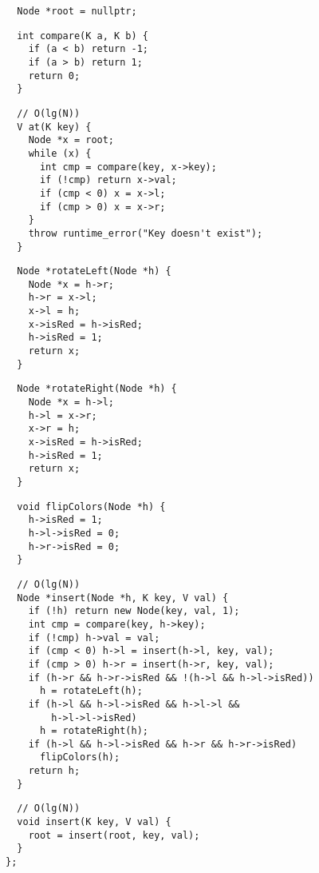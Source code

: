 \documentclass[twoside]{article}
\begin{document}
\begin{multicols*}{2}
\begin{verbatim}
  Node *root = nullptr;
\end{verbatim}
\vspace{-12pt}
\begin{verbatim}
  int compare(K a, K b) {
    if (a < b) return -1;
    if (a > b) return 1;
    return 0;
  }
\end{verbatim}
\vspace{-12pt}
\begin{verbatim}
  // O(lg(N))
  V at(K key) {
    Node *x = root;
    while (x) {
      int cmp = compare(key, x->key);
      if (!cmp) return x->val;
      if (cmp < 0) x = x->l;
      if (cmp > 0) x = x->r;
    }
    throw runtime_error("Key doesn't exist");
  }
\end{verbatim}
\vspace{-12pt}
\begin{verbatim}
  Node *rotateLeft(Node *h) {
    Node *x = h->r;
    h->r = x->l;
    x->l = h;
    x->isRed = h->isRed;
    h->isRed = 1;
    return x;
  }
\end{verbatim}
\vspace{-12pt}
\begin{verbatim}
  Node *rotateRight(Node *h) {
    Node *x = h->l;
    h->l = x->r;
    x->r = h;
    x->isRed = h->isRed;
    h->isRed = 1;
    return x;
  }
\end{verbatim}
\vspace{-12pt}
\begin{verbatim}
  void flipColors(Node *h) {
    h->isRed = 1;
    h->l->isRed = 0;
    h->r->isRed = 0;
  }
\end{verbatim}
\vspace{-12pt}
\begin{verbatim}
  // O(lg(N))
  Node *insert(Node *h, K key, V val) {
    if (!h) return new Node(key, val, 1);
    int cmp = compare(key, h->key);
    if (!cmp) h->val = val;
    if (cmp < 0) h->l = insert(h->l, key, val);
    if (cmp > 0) h->r = insert(h->r, key, val);
    if (h->r && h->r->isRed && !(h->l && h->l->isRed))
      h = rotateLeft(h);
    if (h->l && h->l->isRed && h->l->l &&
        h->l->l->isRed)
      h = rotateRight(h);
    if (h->l && h->l->isRed && h->r && h->r->isRed)
      flipColors(h);
    return h;
  }
\end{verbatim}
\vspace{-12pt}
\begin{verbatim}
  // O(lg(N))
  void insert(K key, V val) {
    root = insert(root, key, val);
  }
};
\end{verbatim}


\end{multicols*}
\end{document}
